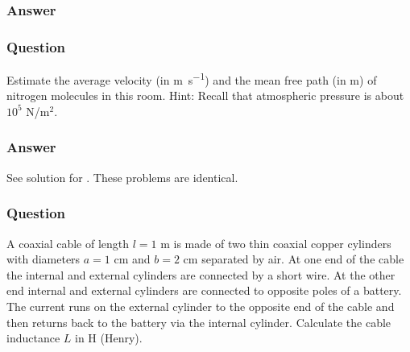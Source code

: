 \subsubsection{Answer}



\subsubsection{Question}

Estimate the average velocity (in \si{\m\per\s}) and the mean free path (in \si{\m}) of nitrogen molecules in this room. Hint: Recall that atmospheric pressure is about $10^5$ N/m$^2$.
\subsubsection{Answer}
See solution for . These problems are identical.


\subsubsection{Question}
A coaxial cable of length $l=1$ m is made of two thin coaxial copper cylinders with diameters $a = 1$ cm and $b = 2$ cm separated by air. At one end of the cable the internal and external cylinders are connected by a short wire. At the other end internal and external cylinders are connected to opposite poles of a battery. The current runs on the external cylinder to the opposite end of the cable and then returns back to the battery via the internal cylinder. Calculate the cable inductance $L$ in H (Henry).
